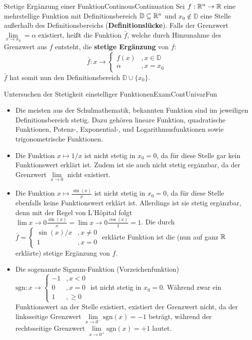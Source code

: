 \begin{definition}{Stetige Ergänzung einer Funktion}{ContinousContinuation}
    Sei $f: \mathbb{R}^n\to\mathbb{R}$ eine mehrstellige Funktion mit Definitionsbereich $\mathbb{D}\subseteq\mathbb{R}^n$ und $x_0\notin\mathbb{D}$ eine Stelle außerhalb des Definitionsbereichs (\textbf{Definitionslücke}). Falls der Grenzwert $\lim\limits_{x\to x_0} = \alpha$ existiert, heißt die Funktion $\bar{f}$, welche durch Hinzunahme des Grenzwert aus $f$ entsteht, die \textbf{stetige Ergänzung} von $f$:
    $$
        \bar{f}: x \to \begin{cases}
            f(x) & , x \in \mathbb{D} \\
            \alpha & , x = x_0
        \end{cases}
    $$
    $\bar{f}$ hat somit nun den Definitionsbereich $\mathbb{D} \cup \lbrace x_0 \rbrace$.
\end{definition}

\begin{example}{Untersuchen der Stetigkeit einstelliger Funktionen}{ExamContUnivarFun}
    \begin{itemize}
        \item Die meisten aus der Schulmathematik, bekannten Funktion sind im jeweiligen Definitionsbereich stetig. Dazu gehören lineare Funktion, quadratische Funktionen, Potenz-, Exponential-, und Logarithmusfunktionen sowie trigonometrische Funktionen.
        \item Die Funktion $x\mapsto 1/x$ ist nicht stetig in $x_0=0$, da für diese Stelle gar kein Funktionswert erklärt ist. Zudem ist sie auch nicht stetig ergänzbar, da der Grenzwert $\lim\limits_{x\to 0}$ nicht existiert.
        \item Die Funktion $x \mapsto \frac{\sin(x)}{x}$ ist nicht stetig in $x_0=0$, da für diese Stelle ebenfalls keine Funktionswert erklärt ist. Allerdings ist sie stetig ergänzbar, denn mit der Regel von L'Hôpital folgt $\lim\limits{x\to 0} \frac{\sin(x)}{x} = \lim\limits{x\to 0} \frac{\cos(x)}{1} = 1$. Die durch $\bar{f} = \begin{cases} \sin(x)/x & , x \ne 0 \\ 1 & , x = 0 \end{cases}$ erklärte Funktion ist die (nun auf ganz $\mathbb{R}$ erklärte) stetige Ergänzung von $f$.
        \item Die sogenannte Signum-Funktion (Vorzeichenfunktion) $\text{sgn}: x \to \begin{cases} -1 &, x < 0 \\ 0 &, x = 0 \\ 1 &, \ge 0 \end{cases}$ ist nicht stetig in $x_0=0$. Während zwar ein Funktionswert an der Stelle existiert, existiert der Grenzwert nicht, da der linksseitige Grenzwert $\lim\limits_{x\to 0^-} \text{sgn}(x) = -1$ beträgt, während der rechtsseitige Grenzwert $\lim\limits_{x\to 0^+} \text{sgn}(x) = +1$ lautet.
    \end{itemize}
\end{example}

